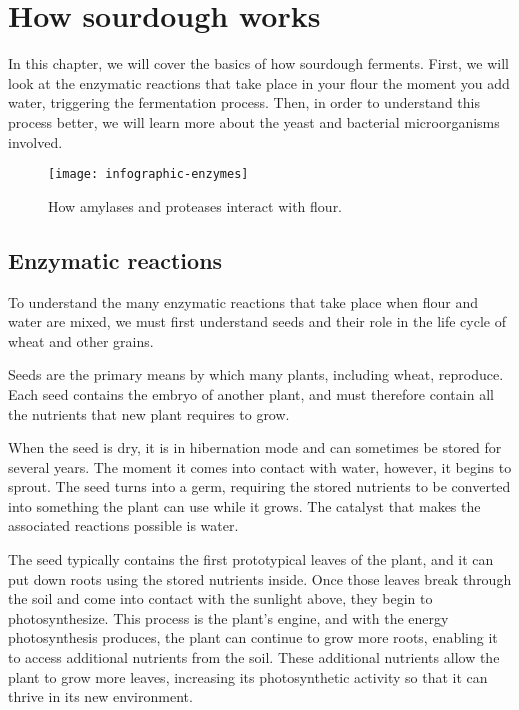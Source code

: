 \chapter{How sourdough works}%
\label{ch:how-sourdough-works}
\begin{quoting}
In this chapter, we will cover the basics of how sourdough ferments.
First, we will look at the enzymatic reactions that take place
in your flour the moment you add water, triggering the fermentation
process. Then, in order to understand this process better, we will
learn more about the yeast and bacterial microorganisms involved.
\end{quoting}

\begin{figure}[!htb]
  \texttt{[image: infographic-enzymes]}
  \caption[Interaction of amylases and flour]{How amylases and proteases
      interact with flour.}%
  \label{infographic-enzymes}
\end{figure}

\section{Enzymatic reactions}

To understand the many enzymatic reactions that take place when flour
and water are mixed, we must first understand seeds and their role in
the life cycle of wheat and other grains.

Seeds are the primary means by which many plants, including wheat,
reproduce. Each seed contains the embryo of another plant, and must
therefore contain all the nutrients that new plant requires to grow.

When the seed is dry, it is in hibernation mode and can sometimes be
stored for several years. The moment it comes into contact with water,
however, it begins to sprout. The seed turns into a germ, requiring the
stored nutrients to be converted into something the plant can use while
it grows. The catalyst that makes the associated reactions possible is water.

The seed typically contains the first prototypical leaves of the plant,
and it can put down roots using the stored nutrients inside. Once those leaves
break through the soil and come into contact with the sunlight above, they
begin to photosynthesize. This process is the plant's engine, and with the
energy photosynthesis produces, the plant can continue to grow more roots,
enabling it to access additional nutrients from the soil. These additional
nutrients allow the plant to grow more leaves, increasing its photosynthetic
activity so that it can thrive in its new environment.

